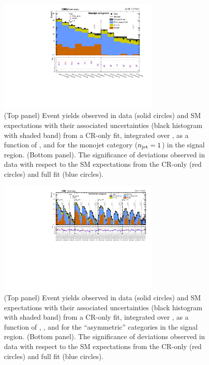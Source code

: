 \begin{figure}[!h]
  \begin{center}
    \includegraphics[width=0.7\textwidth]{summaryPlot_Monojet_prefit_overlay_fit_b_CRFit}
    \caption{(Top panel) Event yields observed in data (solid circles)
      and SM expectations with their associated uncertainties (black
      histogram with shaded band) from a CR-only fit, integrated over
      \HTmiss, as a function of \nb, and \scalht for the monojet
      category ($n_{\text{jet}} = 1$) in the signal region. (Bottom panel). The
      significance of deviations observed in data with respect to the
      SM expectations from the CR-only (red circles) and full fit
      (blue circles).  }
    \label{fig:mono}
  \end{center}
\end{figure}

\begin{figure}[!h]
  \begin{center}
    \includegraphics[angle=90,width=0.7\textwidth]{summaryPlot_Asymmetric_prefit_overlay_fit_b_CRFit}
    \caption{(Top panel) Event yields observed in data (solid circles)
      and SM expectations with their associated uncertainties (black
      histogram with shaded band) from a CR-only fit, integrated
      over \HTmiss, as a function of \njet, \nb, and \scalht for the
      ``asymmetric'' \njet categories in the signal region. (Bottom
      panel). The significance of deviations observed in data with
      respect to the SM expectations from the CR-only (red circles)
      and full fit (blue circles).  }
    \label{fig:asym}
  \end{center}
\end{figure}

